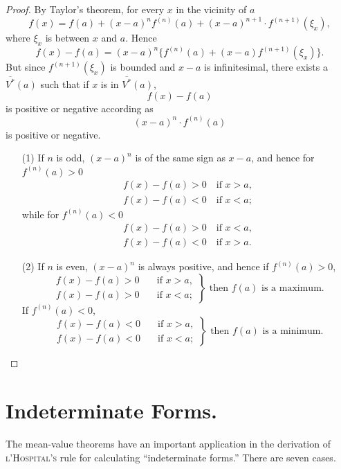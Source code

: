 \documentclass[a4paper,12pt]{book}[2004/02/16]
\providecommand{\colorbox}[2]{#2}
\newcommand{\correction}[2]{\colorbox{corr}{#1}}
\providecommand{\hypertarget}[2]{#2}
\theoremstyle{ilemma}
\theoremstyle{itheorem}
\theoremstyle{iother}
\theoremstyle{icorollary}
\theoremstyle{numcorollary}
\theoremstyle{idefinition}
\begin{document}
\begin{proof}
By Taylor's theorem, for every $x$ in the vicinity of \correction{$a$}{a}
\[
  f(x)=f(a) + (x-a)^nf^{(n)}(a)+(x-a)^{n+1}\cdot f^{(n+1)}(\xi_x),
\]
where $\xi_x$ is between $x$ and $a$.  Hence
\[
  f(x)-f(a) = (x-a)^n\{f^{(n)}(a)+(x-a)f^{(n+1)}(\xi_x)\}.
\]
But since $f^{(n+1)}(\xi_x)$ is bounded and $x-a$ is infinitesimal,
there exists a $\overline{V^*}(a)$ such that if $x$ is in
$\overline{V^*}(a)$,
\[
  f(x)-f(a)
\]
is positive or negative according as
\[
  (x-a)^n\cdot f^{(n)}(a)
\]
is positive or negative.
\begin{enumerate}
\item[(1)] If $n$ is odd, $(x-a)^n$ is of the same sign as $x-a$, and
hence for $f^{(n)}(a)>0$
\begin{gather*}
f(x)-f(a)>0 \quad \text{if }  x>a,\\
f(x)-f(a)<0 \quad \text{if }  x<a;
\end{gather*}
while for $f^{(n)}(a)<0$
\begin{gather*}
f(x)-f(a)>0 \quad \text{if }  x<a,\\
f(x)-f(a)<0 \quad \text{if }  x>a.
\end{gather*}

\item[(2)] If $n$ is even, $(x-a)^n$ is always positive, and hence if
$f^{(n)}(a) >0$,
\[
  \left.
  \begin{aligned}
  f(x)-f(a)>0 \quad &\text{if }  x>a,\\
  f(x)-f(a)>0 \quad &\text{if }  x<a;
  \end{aligned}\right\}
  \text{ then $f(a)$ is a maximum.}
\]
If $f^{(n)}(a)<0$,
\[
\left.
\begin{aligned}
  f(x)-f(a)<0 &\quad \text{if } x>a, \\
  f(x)-f(a)<0 &\quad \text{if } x<a;
\end{aligned}
\right\} \text{ then $f(a)$ is a minimum.}
\]
\end{enumerate}
\end{proof}


\section{Indeterminate Forms.}\hypertarget{chVIIsec6}{}%

The mean-value theorems have an important application in the
derivation of \textsc{l'Hospital's} rule for calculating
``indeterminate forms.'' There are seven cases.
\end{document}

